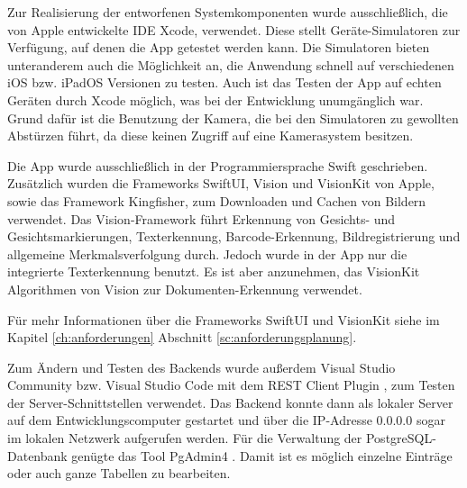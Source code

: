 \documentclass[nomenclature, oneside, 150]{HSMW-Thesis}
\begin{document}
		Zur Realisierung der entworfenen Systemkomponenten wurde ausschließlich, die von Apple entwickelte IDE Xcode, verwendet. Diese stellt Geräte-Simulatoren zur Verfügung, auf denen die App getestet werden kann. Die Simulatoren bieten unteranderem auch die Möglichkeit an, die Anwendung schnell auf verschiedenen iOS bzw. iPadOS Versionen zu testen. Auch ist das Testen der App auf echten Geräten durch Xcode möglich, was bei der Entwicklung unumgänglich war. Grund dafür ist die Benutzung der Kamera, die bei den Simulatoren zu gewollten Abstürzen führt, da diese keinen Zugriff auf eine Kamerasystem besitzen.
		
		Die App wurde ausschließlich in der Programmiersprache Swift geschrieben. Zusätzlich wurden die Frameworks SwiftUI, Vision und VisionKit von Apple, sowie das Framework Kingfisher, zum Downloaden und Cachen von Bildern verwendet. Das Vision-Framework führt Erkennung von Gesichts- und Gesichtsmarkierungen, Texterkennung, Barcode-Erkennung, Bildregistrierung und allgemeine Merkmalsverfolgung durch. Jedoch wurde in der App nur die integrierte Texterkennung benutzt. Es ist aber anzunehmen, das VisionKit Algorithmen von Vision zur Dokumenten-Erkennung verwendet.
		
		Für mehr Informationen über die Frameworks SwiftUI und VisionKit siehe im Kapitel \ref{ch:anforderungen} Abschnitt \ref{sc:anforderungsplanung}.
		
		
		Zum Ändern und Testen des Backends wurde außerdem Visual Studio Community bzw. Visual Studio Code mit dem REST Client Plugin , zum Testen der Server-Schnittstellen verwendet. Das Backend konnte dann als lokaler Server auf dem Entwicklungscomputer gestartet und über die IP-Adresse 0.0.0.0 sogar im lokalen Netzwerk aufgerufen werden. Für die Verwaltung der PostgreSQL-Datenbank genügte das Tool PgAdmin4 . Damit ist es möglich einzelne Einträge oder auch ganze Tabellen zu bearbeiten.
		
\end{document}
